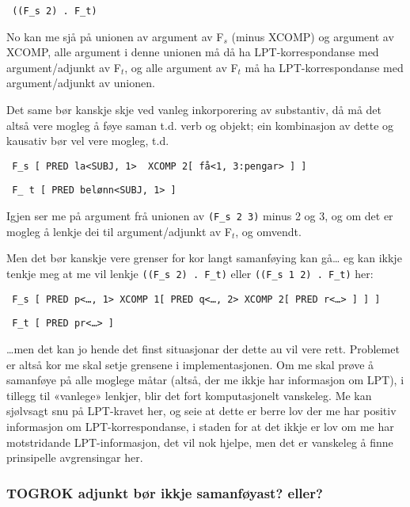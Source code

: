 \documentclass[11pt,a4paper,oneside,draft]{book}
\begin{document}
\begin{verbatim}
 ((F_s 2) . F_t)
\end{verbatim}


No kan me sjå på unionen av argument av F$_s$ (minus XCOMP) og argument
av XCOMP, alle argument i denne unionen må då ha LPT-korrespondanse
med argument/adjunkt av F$_t$, og alle argument av F$_t$ må ha
LPT-korrespondanse med argument/adjunkt av unionen.

Det same bør kanskje skje ved vanleg inkorporering av substantiv, då
må det altså vere mogleg å føye saman t.d. verb og objekt; ein
kombinasjon av dette og kausativ bør vel vere mogleg, t.d.

\begin{verbatim}
 F_s [ PRED la<SUBJ, 1>  XCOMP 2[ få<1, 3:pengar> ] ]
\end{verbatim}


\begin{verbatim}
 F_ t [ PRED belønn<SUBJ, 1> ]
\end{verbatim}


Igjen ser me på argument frå unionen av \texttt{(F\_s 2 3)} minus 2 og 3, og
om det er mogleg å lenkje dei til argument/adjunkt av F$_t$, og omvendt.

Men det bør kanskje vere grenser for kor langt samanføying kan gå… eg
kan ikkje tenkje meg at me vil lenkje \texttt{((F\_s 2) . F\_t)} eller \texttt{((F\_s 1 2) . F\_t)} her:

\begin{verbatim}
 F_s [ PRED p<…, 1> XCOMP 1[ PRED q<…, 2> XCOMP 2[ PRED r<…> ] ] ]
\end{verbatim}


\begin{verbatim}
 F_t [ PRED pr<…> ]
\end{verbatim}


\ldots{}men det kan jo hende det finst situasjonar der dette au vil vere
rett. Problemet er altså kor me skal setje grensene i
implementasjonen. Om me skal prøve å samanføye på alle moglege måtar
(altså, der me ikkje har informasjon om LPT), i tillegg til «vanlege»
lenkjer, blir det fort komputasjonelt vanskeleg. Me kan sjølvsagt snu
på LPT-kravet her, og seie at dette er berre lov der me har positiv
informasjon om LPT-korrespondanse, i staden for at det ikkje er lov om
me har motstridande LPT-informasjon, det vil nok hjelpe, men det er
vanskeleg å finne prinsipelle avgrensingar her. 
\subsubsection{\textbf{TOGROK} adjunkt bør ikkje samanføyast? eller?}
\label{sec-3.13.1.1}
\end{document}
